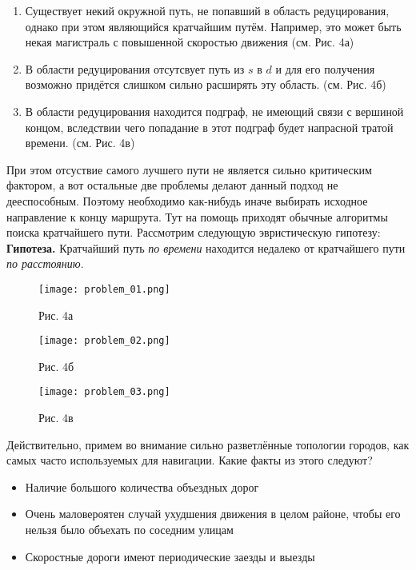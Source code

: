 \documentclass[12pt]{article}
\begin{document}
\begin{enumerate}
    \item Существует некий окружной путь, не попавший в область редуцирования, однако при этом являющийся кратчайшим путём. Например, это может быть некая магистраль с повышенной скоростью движения (см. Рис. 4а)
    \item В области редуцирования отсутсвует путь из $s$ в $d$ и для его получения возможно придётся слишком сильно расширять эту область. (см. Рис. 4б)
    \item В области редуцирования находится подграф, не имеющий связи с вершиной концом, вследствии чего попадание в этот подграф будет напрасной тратой времени. (см. Рис. 4в)
\end{enumerate}

При этом отсуствие самого лучшего пути не является сильно критическим фактором, а вот остальные две проблемы делают данный подход не дееспособным. Поэтому необходимо как-нибудь иначе выбирать исходное направление к концу маршрута. Тут на помощь приходят обычные алгоритмы поиска кратчайшего пути. Рассмотрим следующую эвристическую гипотезу:
\\[0.5cm]
\textbf{Гипотеза.} Кратчайший путь \textit{по времени} находится недалеко от кратчайшего пути \textit{по расстоянию}.
\\[0.5cm]

\begin{figure}
  \texttt{[image: problem\_01.png]}
    \begin{center}
        Рис. 4а
    \end{center}
\endminipage\hfill
{}
  \texttt{[image: problem\_02.png]}
        \begin{center}
        Рис. 4б
    \end{center}
\endminipage\hfill
{}
  \texttt{[image: problem\_03.png]}
    \begin{center}
        Рис. 4в
    \end{center}
\endminipage
\end{figure}

Действительно, примем во внимание сильно разветлённые топологии городов, как самых часто используемых для навигации. Какие факты из этого следуют?

\begin{itemize}
    \item Наличие большого количества объездных дорог
    \item Очень маловероятен случай ухудшения движения в целом районе, чтобы его нельзя было объехать по соседним улицам
    \item Скоростные дороги имеют периодические заезды и выезды
\end{itemize}
\end{document}
